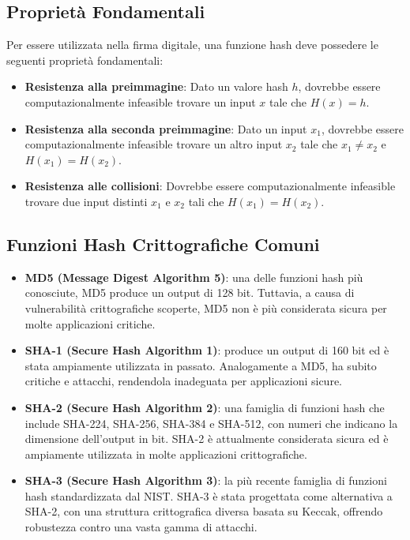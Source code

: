 \documentclass[a4paper,12pt]{report}
\begin{document}
\subsection*{Proprietà Fondamentali}

Per essere utilizzata nella firma digitale, una funzione hash deve possedere le seguenti proprietà fondamentali:

\begin{itemize}
    \item \textbf{Resistenza alla preimmagine}: Dato un valore hash $h$, dovrebbe essere computazionalmente infeasible trovare un input $x$ tale che $H(x) = h$.
    \item \textbf{Resistenza alla seconda preimmagine}: Dato un input $x_1$, dovrebbe essere computazionalmente infeasible trovare un altro input $x_2$ tale che $x_1 \neq x_2$ e $H(x_1) = H(x_2)$.
    \item \textbf{Resistenza alle collisioni}: Dovrebbe essere computazionalmente infeasible trovare due input distinti $x_1$ e $x_2$ tali che $H(x_1) = H(x_2)$.
\end{itemize}

\subsection*{Funzioni Hash Crittografiche Comuni}
\begin{itemize}
    \item \textbf{MD5 (Message Digest Algorithm 5)}: una delle funzioni hash più conosciute, MD5 produce un output di 128 bit. Tuttavia, a causa di vulnerabilità crittografiche scoperte, MD5 non è più considerata sicura per molte applicazioni critiche.
    \item \textbf{SHA-1 (Secure Hash Algorithm 1)}: produce un output di 160 bit ed è stata ampiamente utilizzata in passato. Analogamente a MD5, ha subito critiche e attacchi, rendendola inadeguata per applicazioni sicure.
    \item \textbf{SHA-2 (Secure Hash Algorithm 2)}: una famiglia di funzioni hash che include SHA-224, SHA-256, SHA-384 e SHA-512, con numeri che indicano la dimensione dell'output in bit. SHA-2 è attualmente considerata sicura ed è ampiamente utilizzata in molte applicazioni crittografiche.
    \item \textbf{SHA-3 (Secure Hash Algorithm 3)}: la più recente famiglia di funzioni hash standardizzata dal NIST. SHA-3 è stata progettata come alternativa a SHA-2, con una struttura crittografica diversa basata su Keccak, offrendo robustezza contro una vasta gamma di attacchi.
\end{itemize}
\end{document}
